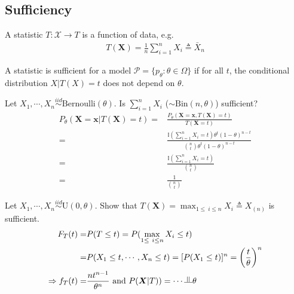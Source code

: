 \subsection{Sufficiency}
\begin{definition}[statistic]
    A statistic $T:\mathcal{X}\to T$ is a function of data, e.g.
    \begin{gather}
        T(\boldsymbol{X})=\frac{1}{n}\sum_{i=1}^n{X_i}\triangleq\bar{X}_n
    \end{gather}
\end{definition}

\begin{definition}
    A statistic is sufficient for a model $\mathcal{P}=\{p_\theta:\theta\in\Omega\}$
    if for all $t$, the conditional distribution $X|T(X)=t$ does not depend on $\theta$.
\end{definition}

\begin{example}
    Let $X_1,\cdots,X_n\overset{iid}{\sim}\text{Bernoulli}(\theta)$.
    Is $\sum_{i=1}^n{X_i}$ ($\sim \text{Bin}(n,\theta)$) sufficient?
    \begin{align}
        P_\theta(\boldsymbol{X}=\boldsymbol{x}|T(\boldsymbol{X})=t)
        =&\frac{P_\theta(\boldsymbol{X}=\boldsymbol{x},T(\boldsymbol{X})=t)}{T(\boldsymbol{X}=t)}\\
        =&\frac{\mathbb{I}(\sum_{i=1}^n{X_i}=t)\theta^t(1-\theta)^{n-t}}{\binom{n}{t}\theta^t(1-\theta)^{n-t}}\\
        =&\frac{\mathbb{I}(\sum_{i=1}^n{X_i}=t)}{\binom{n}{t}}\\
        =&\frac{1}{\binom{n}{t}}
    \end{align}
\end{example}

\begin{example}
    Let $X_1,\cdots,X_n\overset{iid}{\sim}\text{U}(0,\theta)$. 
    Show that $T(\boldsymbol{X})=\max_{1\leq\ i\leq n}X_i\triangleq X_{(n)}$ is sufficient.
    \begin{align}
        F_T(t)=&P(T\leq t)=P(\max_{1\leq\ i\leq n}X_i\leq t)\\
        =&P(X_1\leq t,\cdots,X_n\leq t)=[P(X_1\leq t)]^n=\left(\frac{t}{\theta}\right)^n\\
        \Rightarrow
        f_T(t)=&\frac{nt^{n-1}}{\theta^n}~\text{and}~
        P(\boldsymbol{X}|T))=\cdots\text{\rotatebox{90}{$\models$}}\theta
    \end{align}
\end{example}

